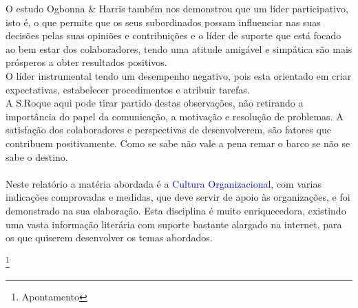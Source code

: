 O estudo Ogbonna \& Harris também nos demonstrou que um líder participativo, isto é, o que permite que os seus subordinados possam influenciar nas suas decisões pelas suas opiniões e contribuições e o líder de suporte que está focado ao bem estar dos colaboradores, tendo uma atitude amigável e simpática são mais prósperos a obter resultados positivos.\\
O líder instrumental tendo um desempenho negativo, pois esta orientado em criar expectativas, estabelecer procedimentos e atribuir tarefas.\\
A S.Roque aqui pode tirar partido destas observações, não retirando a importância do papel da comunicação, a motivação e resolução de problemas.
A satisfação dos colaboradores e perspectivas de desenvolverem, são fatores que contribuem positivamente. Como se sabe não vale a pena remar o barco se não se sabe o destino.\\
\\
Neste relatório a matéria abordada é a \textcolor{blue}{Cultura Organizacional}, com varias indicações comprovadas e medidas, que deve servir de apoio às organizações, e foi demonstrado na sua elaboração. Esta disciplina é muito enriquecedora, existindo uma vasta informação literária com suporte bastante alargado na internet, para os que quiserem desenvolver os temas abordados.
\newpage
%
%
\listoffigures
\cite{*}

\newpage
\footnote{Apontamento}

